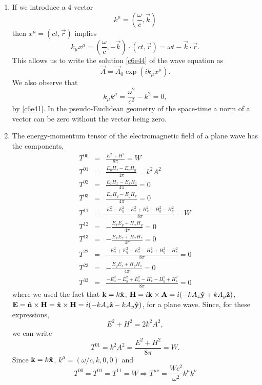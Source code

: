 \begin{enumerate}
\item If we introduce a 4-vector
\begin{equation}\label{c6e54}
k^\mu = \left(\frac{\omega}{c}, \vec{k}\right)
\end{equation}
then $x^\mu = (ct, \vec{r})$ implies
\begin{equation}\label{c6e55}
k_\mu x^\mu = \left(\frac{\omega}{c}, -\vec{k}\right)\cdot(ct, \vec{r})
= \omega t - \vec{k}\cdot\vec{r}.
\end{equation}
This allows us to write the solution \eqref{c6e44} of the wave equation as 
\begin{equation}\label{c6e56}
\vec{A} = \vec{A}_0\exp(ik_\mu x^\mu).
\end{equation}
We also observe that
\begin{equation}\label{c6e57}
k_\mu k^\mu = \frac{\omega^2}{c^2} - k^2 = 0,
\end{equation}
by \eqref{c6e41}. In the pseudo-Euclidean geometry of the space-time a norm of a
vector can be zero without the vector being zero.

\item The energy-momentum tensor of the electromagnetic field of a plane wave has
the components,
\begin{eqnarray*}
T^{00} &=& \frac{E^2 + H^2}{8\pi} = W \\
T^{01} &=& \frac{E_yH_z - E_zH_y}{4\pi} = k^2A^2\\
T^{02} &=& \frac{E_zH_x - E_xH_z}{4\pi} = 0 \\
T^{03} &=& \frac{E_xH_y - E_yH_x}{4\pi} = 0 \\
T^{11} &=& \frac{E_x^2 - E_y^2 - E_z^2 + H_x^2 - H_y^2 - H_z^2}{8\pi} = W \\
T^{12} &=& -\frac{E_xE_y + H_xH_y}{4\pi} = 0\\
T^{13} &=& -\frac{E_xE_z + H_xH_z}{4\pi} = 0\\
T^{22} &=& \frac{-E_x^2 + E_y^2 - E_z^2 - H_x^2 + H_y^2 - H_z^2}{8\pi} = 0\\
T^{23} &=& -\frac{E_yE_z + H_yH_z}{4\pi} = 0 \\
T^{33} &=& \frac{-E_x^2 - E_y^2 + E_z^2 - H_x^2 - H_y^2 + H_z^2}{8\pi} = 0
\end{eqnarray*}
where we used the fact that $\mathbf{k} = k\hat{\mathbf{x}}$, $\mathbf{H} = i\mathbf{k}\times\mathbf{A}
= i(-kA_z\hat{\mathbf{y}} + kA_y\hat{\mathbf{z}})$, $\mathbf{E} = \hat{\mathbf{n}}\times\mathbf{H} = \hat{\mathbf{x}}\times\mathbf{H}
= i(-kA_z\hat{\mathbf{z}} - kA_y\hat{\mathbf{y}})$, for a plane wave. Since, for these expressions,
\[
E^2 + H^2 = 2k^2A^2,
\]
we can write
\begin{equation}\label{c6e58}
T^{01} = k^2A^2 = \frac{E^2 + H^2}{8\pi} = W.
\end{equation}
Since $\mathbf{k} = k\hat{\mathbf{x}}$, $k^\mu = (\omega/c, k, 0, 0)$ and
\begin{equation}\label{c6e59}
T^{00} = T^{01} = T^{11} = W \Rightarrow T^{\mu\nu} = 
\frac{Wc^2}{\omega^2}k^\mu k^\nu
\end{equation}


\end{enumerate}
